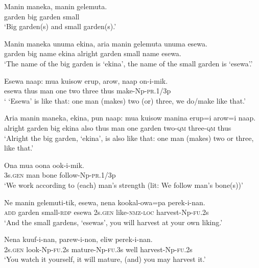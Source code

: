 \ea
\gll  Manin  maneka,  manin  gelemuta. \\
garden  big  garden  small \\
\glt ‘Big garden(s) and small garden(s).’ \\
\z


\ea
\gll  Manin  maneka  unuma  ekina,  aria  manin  gelemuta  unuma  esewa. \\
garden  big  name  ekina  alright  garden  small  name  esewa. \\
\glt ‘The name of the big garden is ‘ekina’, the name of the small garden is ‘esewa’.’ \\
\z


\ea
\gll  Esewa  naap:  mua  kuisow  erup,  arow,  naap  on-i-mik. \\
esewa  thus  man  one  two  three  thus  make-Np-\textsc{pr}.1/3p \\
\glt ‘ ‘Esewa’ is like that: one man (makes) two (or) three, we do/make like that.’ \\
\z


\ea
\gll  Aria  manin  maneka,  ekina,  pun  naap:  mua  kuisow  manina  erup=i arow=i  naap. \\
alright  garden  big  ekina  also  thus  man  one  garden  two-\textsc{qm}           three-\textsc{qm}  thus \\
\glt ‘Alright the big garden, ‘ekina’, is also like that: one man (makes) two or three, like that.’ \\
\z


\ea
\gll  Ona  mua  oona  ook-i-mik. \\
3s.\textsc{gen}  man  bone  follow-Np-\textsc{pr}.1/3p \\
\glt ‘We work according to (each) man’s strength (lit: We follow man’s bone(s))’ \\
\z


\ea
\gll  Ne  manin  gelemuti-tik,  esewa,  nena  kookal-owa=pa  perek-i-nan. \\
\textsc{add}  garden  small-\textsc{rdp}  esewa  2s.\textsc{gen}  like-\textsc{nmz}-\textsc{loc}  harvest-Np-\textsc{fu}.2s \\
\glt ‘And the small gardens, ‘esewas’, you will harvest at your own liking.’ \\
\z


\ea
\gll  Nena  kuuf-i-nan,  parew-i-non,  eliw  perek-i-nan. \\
2s.\textsc{gen}  look-Np-\textsc{fu}.2s  mature-Np-\textsc{fu}.3s  well  harvest-Np-\textsc{fu}.2s \\
\glt ‘You watch it yourself, it will mature, (and) you may harvest it.’ \\
\z

